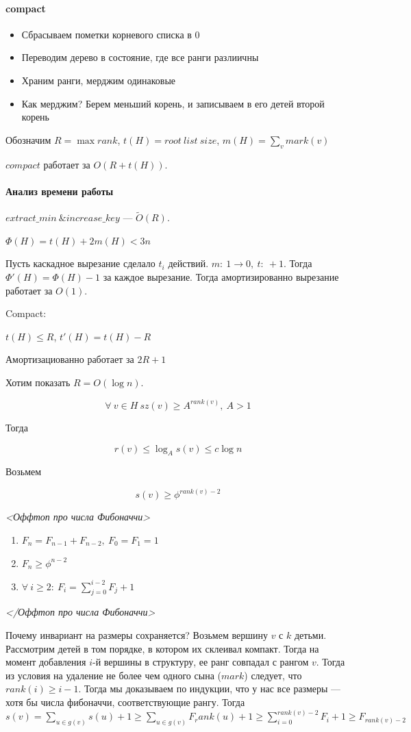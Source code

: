 \documentclass[12pt]{article}
\newcommand{\rangesum}[2]{\displaystyle \sum_{#1}^{#2}}
\begin{document}
\paragraph{compact} 
\begin{itemize}
\item Сбрасываем пометки корневого списка в 0
\item Переводим дерево в состояние, где все ранги разлиичны
\item Храним ранги, мерджим одинаковые
\item Как мерджим? Берем меньший корень, и записываем в его детей второй корень
\end{itemize}

Обозначим $R = \max rank$, $t(H) = root\ list\ size$, $m(H) = \sum_{v} mark(v)$

$compact$ работает за $O(R + t(H))$.

\paragraph{Анализ времени работы}

$extract\_min\ \& increase\_key$ --- $\tilde O(R)$.

$\Phi(H) = t(H) + 2m(H) < 3n$

Пусть каскадное вырезание сделало $t_i $ действий. $m:\ 1 \rightarrow 0,\ t:\ +1$. Тогда $\Phi'(H) = \Phi(H) - 1$ за каждое вырезание.
Тогда амортизированно вырезание работает за $O(1)$.

Compact:

$t(H) \le R$, $t'(H) = t(H) - R$

Амортизациованно работает за $2R + 1$

Хотим показать $R = O(\log n)$.

$$\forall\ v \in H\ sz(v) \ge A^{rank(v)},\ A > 1$$

Тогда 

$$r(v) \le \log_A s(v) \le c \log n$$

Возьмем

$$s(v) \ge \phi^{rank(v) - 2}$$

\textit{<Оффтоп про числа Фибоначчи>} 
\begin{enumerate}
    \item $F_n = F_{n - 1} + F_{n - 2},\ F_0 = F_1 = 1$ 
    \item $F_n \ge \phi^{n - 2}$
    \item $\forall\ i \ge 2:\ F_i = \rangesum{j=0}{i-2}F_j + 1$
\end{enumerate}
\textit{</Оффтоп про числа Фибоначчи>} 

Почему инвариант на размеры сохраняется? Возьмем вершину $v$ с $k$ детьми. Рассмотрим детей в том порядке, в котором их склеивал компакт. Тогда на момент добавления $i$-й вершины в структуру, ее ранг совпадал с рангом $v$. Тогда из условия на удаление не более чем одного сына ($mark$) следует, что $rank(i) \ge i - 1$. Тогда мы доказываем по индукции, что у нас все размеры --- хотя бы числа фибоначчи, соответствующие рангу. Тогда $s(v) = \sum_{u \in g(v)} s(u) + 1 \ge \sum_{u \in g(v)} F_rank(u) + 1 \ge \rangesum{i=0}{rank(v) - 2}F_{i} + 1 \ge F_{rank(v) - 2}$
\end{document}
